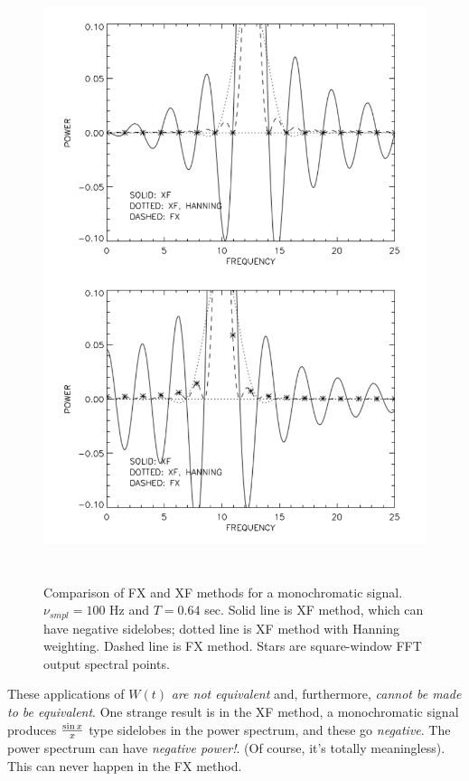 \documentclass[11pt,preprint]{aastex}
\begin{document}
\begin{figure}[H] \begin{center} \leavevmode
\includegraphics[height=7in]{fig4.pdf} \end{center} 

\caption{Comparison of FX and XF methods for a monochromatic signal.
$\nu_{smpl}=100$ Hz and $T= 0.64$ sec. Solid line is XF method, which
can have negative sidelobes; dotted line is XF method with Hanning
weighting. Dashed line is FX method. Stars are square-window FFT output
spectral points. \label{figfour}} \end{figure}

	These applications of $W(t)$ {\it are not equivalent} and,
furthermore, {\it cannot be made to be equivalent}. One strange result
is in the XF method, a monochromatic signal produces $\sin x \over x$
type sidelobes in the power spectrum, and these go {\it negative}. The
power spectrum can have {\it negative power!}. (Of course, it's totally
meaningless). This can never happen in the FX method.
\end{document}
